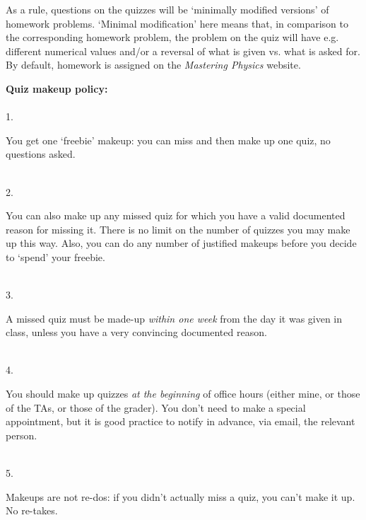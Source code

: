 \documentclass[12pt]{article}
\newlength{\quizlabelwidth}
\newlength{\quiztextwidth}
\begin{document}
As a rule, questions on the quizzes will be `minimally modified versions' of homework problems. `Minimal modification' here  means that, in comparison to the corresponding homework problem, the problem on the quiz will have e.g. different numerical values and/or a reversal of what is given vs. what is asked for. By default, homework is assigned on the \textit{Mastering Physics} website.
\vfill\mbox{}
\newpage

\settowidth{\quizlabelwidth}{Makeu}
\textbf{Quiz makeup policy:}\\
\baselineskip
\mbox{}\\
\mbox{}\vspace{1ex}\hspace{\quizlabelwidth} 1. \begin{minipage}[t]{\quiztextwidth}You get one `freebie' makeup: you can miss and then make up one quiz, no questions asked.
\end{minipage}\\
\mbox{}\vspace{1ex}\hspace{\quizlabelwidth} 2. \begin{minipage}[t]{\quiztextwidth}
          You can also make up any missed quiz for which you have a valid documented reason for missing it. There is no limit on the number of quizzes you may make up this way. Also, you can do any number of justified makeups before you decide to `spend' your freebie.
         \end{minipage}\\
\mbox{}\vspace{1ex}\hspace{\quizlabelwidth} 3. \begin{minipage}[t]{\quiztextwidth}
          A missed quiz must be made-up \textit{within one week} from the day it was given in class, unless you have a very convincing documented reason.
         \end{minipage}\\
\mbox{}\vspace{1ex}\hspace{\quizlabelwidth} 4. \begin{minipage}[t]{\quiztextwidth}
           You should make up quizzes \textit{at the beginning} of office hours (either mine, or those of the TAs, or those of the grader). 
You don't need to make a special appointment, but it is good practice to notify in advance, via email, the relevant person.
         \end{minipage}\\
\mbox{}\vspace{1ex}\hspace{\quizlabelwidth} 5. \begin{minipage}[t]{\quiztextwidth}
           Makeups are not re-dos: if you didn't actually miss a quiz, you can't make it up. No re-takes.
         \end{minipage}
\end{document}
